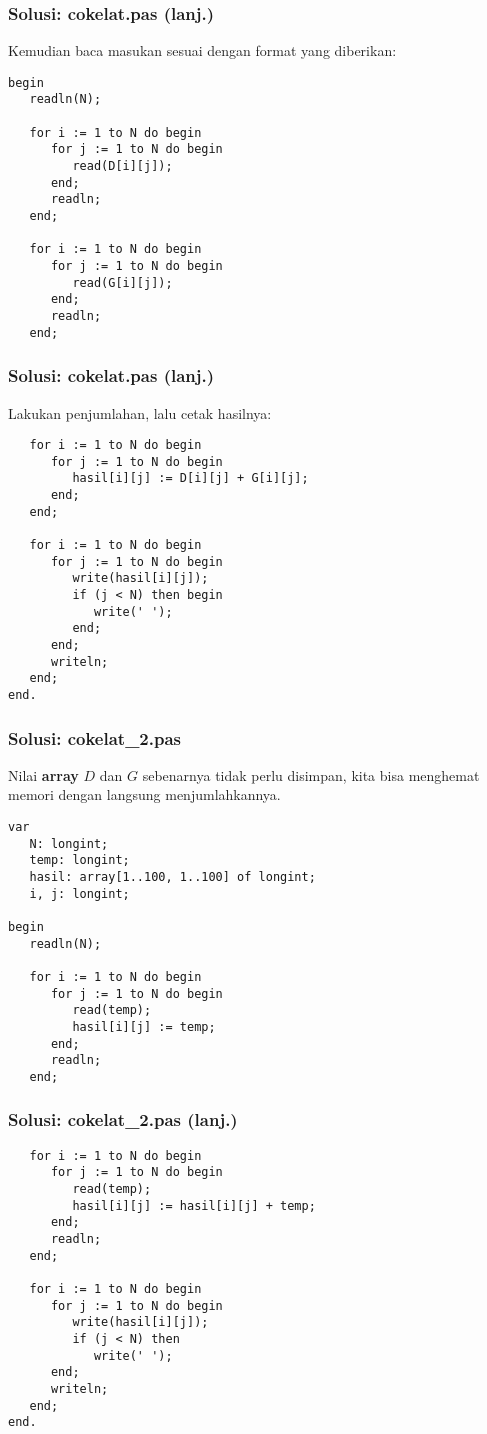 \documentclass{beamer}
\begin{document}
\begin{frame}[fragile]
\frametitle{Solusi: cokelat.pas (lanj.)}
Kemudian baca masukan sesuai dengan format yang diberikan:
\begin{lstlisting}
begin
   readln(N);
   
   for i := 1 to N do begin
      for j := 1 to N do begin
         read(D[i][j]);
      end;
      readln;
   end;

   for i := 1 to N do begin
      for j := 1 to N do begin
         read(G[i][j]);
      end;
      readln;
   end;
\end{lstlisting}
\end{frame}

\begin{frame}[fragile]
\frametitle{Solusi: cokelat.pas (lanj.)}
Lakukan penjumlahan, lalu cetak hasilnya:
\begin{lstlisting}
   for i := 1 to N do begin
      for j := 1 to N do begin
         hasil[i][j] := D[i][j] + G[i][j];
      end;
   end;   

   for i := 1 to N do begin
      for j := 1 to N do begin
         write(hasil[i][j]);
         if (j < N) then begin
            write(' ');
         end;
      end;
      writeln;
   end;
end.
\end{lstlisting}
\end{frame}

\begin{frame}[fragile]
\frametitle{Solusi: cokelat\_2.pas}
Nilai \textbf{array} $D$ dan $G$ sebenarnya tidak perlu disimpan, kita bisa menghemat memori dengan langsung menjumlahkannya. 
\begin{lstlisting}
var
   N: longint;
   temp: longint;
   hasil: array[1..100, 1..100] of longint;
   i, j: longint;

begin
   readln(N);
   
   for i := 1 to N do begin
      for j := 1 to N do begin
         read(temp);
         hasil[i][j] := temp;
      end;
      readln;
   end;
\end{lstlisting}
\end{frame}

\begin{frame}[fragile]
\frametitle{Solusi: cokelat\_2.pas (lanj.)}
\begin{lstlisting}
   for i := 1 to N do begin
      for j := 1 to N do begin
         read(temp);
         hasil[i][j] := hasil[i][j] + temp;
      end;
      readln;
   end;

   for i := 1 to N do begin
      for j := 1 to N do begin
         write(hasil[i][j]);
         if (j < N) then 
            write(' ');
      end;
      writeln;
   end;
end.
\end{lstlisting}
\end{frame}
\end{document}
